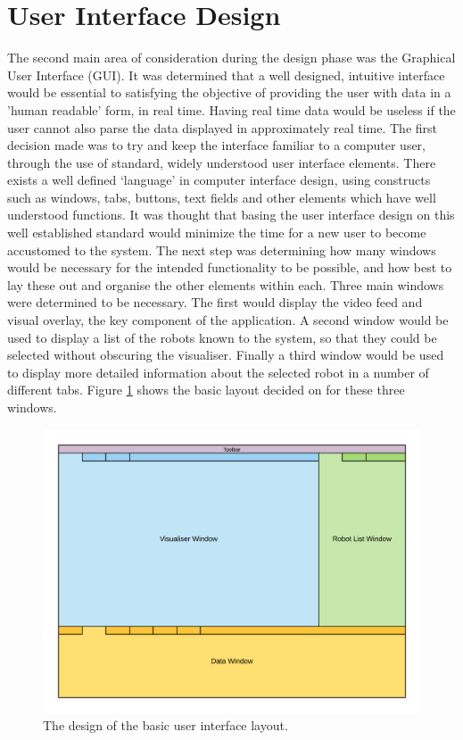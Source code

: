 
\section{User Interface Design}
The second main area of consideration during the design phase was the Graphical User Interface (GUI). It was determined that a well designed, intuitive interface would be essential to satisfying the objective of providing the user with data in a 'human readable' form, in real time. Having real time data would be useless if the user cannot also parse the data displayed in approximately real time. The first decision made was to try and keep the interface familiar to a computer user, through the use of standard, widely understood user interface elements. There exists a well defined `language' in computer interface design, using constructs such as windows, tabs, buttons, text fields and other elements which have well understood functions. It was thought that basing the user interface design on this well established standard would minimize the time for a new user to become accustomed to the system. The next step was determining how many windows would be necessary for the intended functionality to be possible, and how best to lay these out and organise the other elements within each. Three main windows were determined to be necessary. The first would display the video feed and visual overlay, the key component of the application. A second window would be used to display a list of the robots known to the system, so that they could be selected without obscuring the visualiser. Finally a third window would be used to display more detailed information about the selected robot in a number of different tabs. Figure \ref{fig:UILayout} shows the basic layout decided on for these three windows.

\begin{figure}
	\centering
	\includegraphics[scale=1]{Figures/UILayout.png}
	\decoRule
	\caption[UI Layout]{The design of the basic user interface layout.}
	\label{fig:UILayout}
\end{figure}


